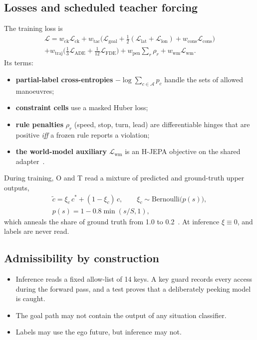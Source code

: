 \documentclass[10pt,twocolumn]{article}
\theoremstyle{remark}
\newcommand{\ADE}{\mathrm{ADE}}
\begin{document}
\subsection{Losses and scheduled teacher forcing}
The training loss is
\begin{multline}
\mathcal L=w_{\mathrm{ck}}\mathcal L_{\mathrm{ck}}+w_{\mathrm{tac}}\big(\mathcal L_{\mathrm{goal}}+\tfrac12(\mathcal L_{\mathrm{lat}}+\mathcal L_{\mathrm{lon}})+w_{\mathrm{cons}}\mathcal L_{\mathrm{cons}}\big)\\
+w_{\mathrm{traj}}\big(\tfrac13\mathcal L_{\ADE}+\tfrac1{12}\mathcal L_{\mathrm{FDE}}\big)+w_{\mathrm{pen}}\textstyle\sum_r\rho_r+w_{\mathrm{wm}}\mathcal L_{\mathrm{wm}}.
\end{multline}
Its terms:
\begin{itemize}
  \item \textbf{partial-label cross-entropies} $-\log\sum_{c\in\mathcal A}p_c$ handle the sets of allowed manoeuvres;
  \item \textbf{constraint cells} use a masked Huber loss;
  \item \textbf{rule penalties} $\rho_r$ (speed, stop, turn, lead) are differentiable hinges that are positive \emph{iff} a frozen rule reports a
        violation;
  \item \textbf{the world-model auxiliary} $\mathcal L_{\mathrm{wm}}$ is an H-JEPA objective on the shared adapter~\cite{hjepa}.
\end{itemize}
During training, O and T read a mixture of predicted and ground-truth upper outputs,
\begin{equation}
\begin{gathered}
\tilde c=\xi_c\,c^\ast+(1-\xi_c)\,\hat c,\qquad \xi_c\sim\mathrm{Bernoulli}\big(p(s)\big),\\
p(s)=1-0.8\min(s/S,1),
\end{gathered}
\end{equation}
which anneals the share of ground truth from 1.0 to 0.2~\cite{schedsamp}. At inference $\xi\equiv0$, and labels are never read.

\subsection{Admissibility by construction}
\begin{itemize}
  \item Inference reads a fixed allow-list of 14 keys. A key guard records every access during the forward pass, and a test proves
        that a deliberately peeking model is caught.
  \item The goal path may not contain the output of any situation classifier.
  \item Labels may use the ego future, but inference may not.
\end{itemize}
\end{document}
